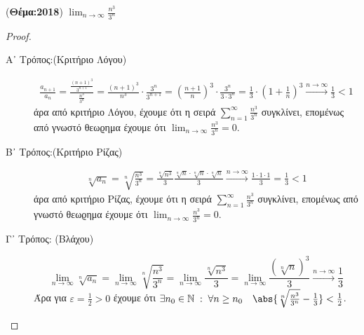         \item ({\bfseries Θέμα:2018}) $ \lim_{n \to \infty} \frac{n^{3}}{3^{n}} $ 
          \begin{proof}
            \begin{description}
              \item [Α᾽ Τρόπος:(Κριτήριο Λόγου)]
                \begin{align*}
                  \frac{a_{n+1}}{a_{n}} = 
                  \frac{\frac{(n+1)^{3}}{3^{n+1}}}{\frac{n^{3}}{3^{n}}} = 
                  \frac{(n+1)^{3}}{n^{3}} \cdot \frac{3^{n}}{3^{n+1}} = 
                  \left(\frac{n+1}{n} \right)^{3} \cdot \frac{3^{n}}{3\cdot 3^{n}} = 
                  \frac{1}{3} \cdot \left(1 + \frac{1}{n}\right)^{3} 
                  \xrightarrow{n \to \infty} \frac{1}{3} < 1
                \end{align*}
                άρα από κριτήριο Λόγου, έχουμε ότι η σειρά 
                $ \sum_{n=1}^{\infty} \frac{n^{3}}{3^{n}} $ συγκλίνει, επομένως 
                από γνωστό θεωϱημα έχουμε ότι $ \lim_{n \to \infty} 
                \frac{n^{3}}{3^{n}} = 0 $.

              \item [Β᾽ Τρόπος:(Κριτήριο Ρίζας)]
                \begin{align*}
                  \sqrt[n]{a_{n}} = \sqrt[n]{\frac{n^{3}}{3^{n}}} = 
                  \frac{\sqrt[n]{n^{3}}}{3} \frac{\sqrt[n]{n} 
                    \cdot \sqrt[n]{n} \cdot \sqrt[n]{n}
                  }{3} \xrightarrow{n \to \infty} \frac{1 \cdot 1 \cdot 1}{3} = 
                  \frac{1}{3} < 1
                \end{align*}
                άρα από κριτήριο Ρίζας, έχουμε ότι η σειρά 
                $ \sum_{n=1}^{\infty} \frac{n^{3}}{3^{n}} $ συγκλίνει, επομένως 
                από γνωστό θεωϱημα έχουμε ότι $ \lim_{n \to \infty} 
                \frac{n^{3}}{3^{n}} = 0 $.

              \item [Γ᾽ Τρόπος: (Βλάχου)]
                \[
                  \lim_{n \to \infty} \sqrt[n]{a_{n}} = \lim_{n \to \infty} 
                  \sqrt[n]{\frac{n^{3}}{3^{n}}} = \lim_{n \to \infty} 
                  \frac{\sqrt[n]{n^{3}}}{3} = \lim_{n \to \infty} 
                  \frac{(\sqrt[n]{n})^{3}}{3} \xrightarrow{n \to \infty} 
                  \frac{1}{3}  
                \] 
                Άρα για $ \varepsilon = \frac{1}{2} >0 $ έχουμε ότι $ \exists n_{0} 
                \in \mathbb{N} \; : \; \forall n \geq n_{0} \quad 
                \abs{\sqrt[n]{\frac{n^{3}}{3^{n}}} - \frac{1}{3}} < 
                \frac{1}{2} $.


\end{description}
\end{proof}
